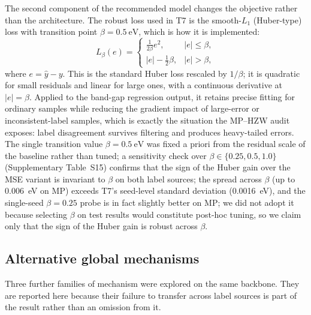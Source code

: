 \documentclass[a4paper,11pt]{article}
\newcommand{\ev}{\mathrm{eV}}
\begin{document}
The second component of the recommended model changes the objective rather than the architecture. The robust loss used in T7 is the smooth-\(L_1\) (Huber-type) loss with transition point \(\beta=0.5\ \ev\), which is how it is implemented:
\begin{equation}
L_{\beta}(e)=
\begin{cases}
\frac{1}{2\beta}e^2, & |e|\le \beta,\\
|e|-\frac{1}{2}\beta, & |e|>\beta,
\end{cases}
\end{equation}
where \(e=\hat{y}-y\). This is the standard Huber loss rescaled by \(1/\beta\); it is quadratic for small residuals and linear for large ones, with a continuous derivative at \(|e|=\beta\). Applied to the band-gap regression output, it retains precise fitting for ordinary samples while reducing the gradient impact of large-error or inconsistent-label samples, which is exactly the situation the MP--HZW audit exposes: label disagreement survives filtering and produces heavy-tailed errors. The single transition value \(\beta=0.5\ \ev\) was fixed a priori from the residual scale of the baseline rather than tuned; a sensitivity check over \(\beta\in\{0.25,0.5,1.0\}\) (Supplementary Table~S15) confirms that the sign of the Huber gain over the MSE variant is invariant to \(\beta\) on both label sources; the spread across \(\beta\) (up to 0.006~eV on MP) exceeds T7's seed-level standard deviation (0.0016~eV), and the single-seed \(\beta=0.25\) probe is in fact slightly better on MP; we did not adopt it because selecting \(\beta\) on test results would constitute post-hoc tuning, so we claim only that the sign of the Huber gain is robust across \(\beta\).

\subsection{Alternative global mechanisms}
\label{sec:alt-global}

Three further families of mechanism were explored on the same backbone. They are reported here because their failure to transfer across label sources is part of the result rather than an omission from it.
\end{document}
